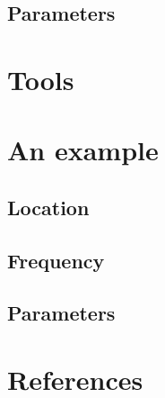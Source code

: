 \documentclass[
]{book}
\begin{document}
\hypertarget{parameters}{%
\subsection{Parameters}\label{parameters}}

\hypertarget{tools-4}{%
\section{Tools}\label{tools-4}}

\hypertarget{an-example-3}{%
\section{An example}\label{an-example-3}}

\hypertarget{location-1}{%
\subsection{Location}\label{location-1}}

\hypertarget{frequency-1}{%
\subsection{Frequency}\label{frequency-1}}

\hypertarget{parameters-1}{%
\subsection{Parameters}\label{parameters-1}}

\hypertarget{references}{%
\section*{References}\label{references}}

  
\end{document}
